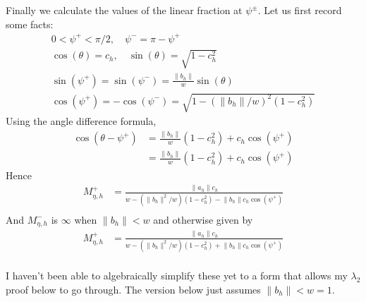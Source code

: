 \documentclass{imsart}
\newcommand{\norm}[1]{\lVert #1 \rVert}
\begin{document}
Finally we calculate the values of the linear fraction at $\psi^{\pm}$. Let us first record some facts:
\begin{align*}
0 < \psi^+ < \pi/2, \quad \psi^- = \pi - \psi^+ \\
\cos(\theta) = c_h, \quad \sin(\theta) = \sqrt{1-c_h^2} \\
\sin(\psi^+) = \sin(\psi^-) = \frac{\norm{b_h}}{w} \sin(\theta) \\
\cos(\psi^+) = -\cos(\psi^-) = \sqrt{1 - (\norm{b_h}/w)^2(1-c_h^2)}
\end{align*}
Using the angle difference formula,
\begin{align*}
\cos(\theta - \psi^+) & = \frac{\norm{b_h}}{w} (1-c_h^2) +  c_h \cos(\psi^+) \\
& = \frac{\norm{b_h}}{w} (1-c_h^2) +  c_h \cos(\psi^+)
\end{align*}
Hence
\begin{align*}
M^+_{\eta, h} & = \frac{ \norm{a_h} c_h }{ w - (\norm{b_h}^2/w) (1-c_h^2) - \norm{b_h} c_h \cos(\psi^+) } \\
\end{align*}
And $M^-_{\eta, h}$ is $\infty$ when $\norm{b_h} < w$ and otherwise given by
\begin{align*}
M^+_{\eta, h} & = \frac{ \norm{a_h} c_h }{ w - (\norm{b_h}^2/w) (1-c_h^2) + \norm{b_h} c_h \cos(\psi^+) } \\
\end{align*}

I haven't been able to algebraically simplify these yet to a form that allows my $\lambda_2$ proof below to go through. The version below just assumes $\norm{b_h} < w = 1$.
\end{document}
